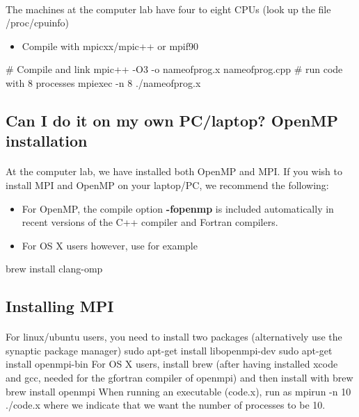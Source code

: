 \documentclass[%
oneside,                 %
final,                   %
10pt]{article}
\begin{document}
\paragraph{}
The  machines at the computer lab have four to eight CPUs (look up the file /proc/cpuinfo)
\begin{itemize}
\item Compile with mpicxx/mpic++ or mpif90
\end{itemize}

\noindent
\bcppcod
  # Compile and link
  mpic++ -O3 -o nameofprog.x nameofprog.cpp
  #  run code with 8 processes
  mpiexec -n 8 ./nameofprog.x
\ecppcod



\subsection{Can I do it on my own PC/laptop? OpenMP installation}

\paragraph{}
At the computer lab, we have installed both OpenMP and MPI. If you wish to install MPI and OpenMP 
on your laptop/PC, we recommend the following:
\begin{itemize}
\item For OpenMP, the compile option \textbf{-fopenmp} is included automatically in recent versions of the C++ compiler and Fortran compilers. 

\item For OS X users however, use for example 
\end{itemize}

\noindent
\bcppcod
  brew install clang-omp
\ecppcod





\subsection{Installing MPI}

\paragraph{}
For linux/ubuntu users, you need to install two packages (alternatively use the synaptic package manager)
\bcppcod
  sudo apt-get install libopenmpi-dev
  sudo apt-get install openmpi-bin
\ecppcod
For OS X users, install brew (after having installed xcode and gcc, needed for the 
gfortran compiler of openmpi) and then install with brew
\bcppcod
   brew install openmpi
\ecppcod
When running an executable (code.x), run as
\bcppcod
  mpirun -n 10 ./code.x
\ecppcod
where we indicate that we want  the number of processes to be 10.
\end{document}
